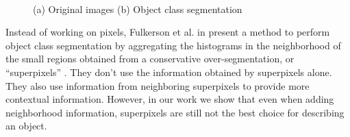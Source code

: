 \documentclass[10pt,twocolumn,letterpaper]{article}
\begin{document}
\begin{figure}
\centering
{}\\
\caption{(a) Original images (b) Object class segmentation}
\label{fig:obj_seg}
\end{figure}

Instead of working on pixels, Fulkerson et al. in \cite{fulkerson09class}
present a method to perform object class segmentation by aggregating the
histograms in the neighborhood of the small regions obtained from a conservative
over-segmentation, or ``superpixels'' \cite{Ren03learninga,4587471}.
They don't use the information obtained by superpixels alone. They also
use information from neighboring superpixels to provide more contextual
information. However, in our work we show that even when adding neighborhood
information, superpixels are still not the best choice for describing an object.
\end{document}

